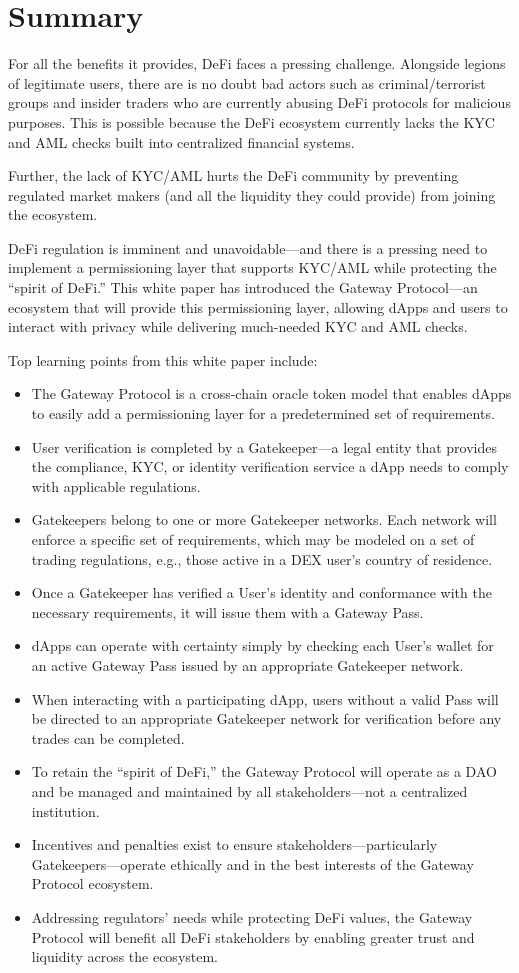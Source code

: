 \section{Summary}
For all the benefits it provides, DeFi faces a pressing challenge. Alongside legions of legitimate users, there are is no doubt bad actors such as criminal/terrorist groups and insider traders who are currently abusing DeFi protocols for malicious purposes. This is possible because the DeFi ecosystem currently lacks the KYC and AML checks built into centralized financial systems.

Further, the lack of KYC/AML hurts the DeFi community by preventing regulated market makers (and all the liquidity they could provide) from joining the ecosystem.

DeFi regulation is imminent and unavoidable—and there is a pressing need to implement a permissioning layer that supports KYC/AML while protecting the “spirit of DeFi.” This white paper has introduced the Gateway Protocol—an ecosystem that will provide this permissioning layer, allowing dApps and users to interact with privacy while delivering much-needed KYC and AML checks.

Top learning points from this white paper include:

\begin{itemize}
\item The Gateway Protocol is a cross-chain oracle token model that enables dApps to easily add a permissioning layer for a predetermined set of requirements.
\item User verification is completed by a Gatekeeper—a legal entity that provides the compliance, KYC, or identity verification service a dApp needs to comply with applicable regulations.
\item Gatekeepers belong to one or more Gatekeeper networks. Each network will enforce a specific set of requirements, which may be modeled on a set of trading regulations, e.g., those active in a DEX user’s country of residence.
\item Once a Gatekeeper has verified a User’s identity and conformance with the necessary requirements, it will issue them with a Gateway Pass.
\item dApps can operate with certainty simply by checking each User’s wallet for an active Gateway Pass issued by an appropriate Gatekeeper network.
\item When interacting with a participating dApp, users without a valid Pass will be directed to an appropriate Gatekeeper network for verification before any trades can be completed.
\item To retain the “spirit of DeFi,” the Gateway Protocol will operate as a DAO and be managed and maintained by all stakeholders—not a centralized institution.
\item Incentives and penalties exist to ensure stakeholders—particularly Gatekeepers—operate ethically and in the best interests of the Gateway Protocol ecosystem.
\item Addressing regulators' needs while protecting DeFi values, the Gateway Protocol will benefit all DeFi stakeholders by enabling greater trust and liquidity across the ecosystem.
\end{itemize}